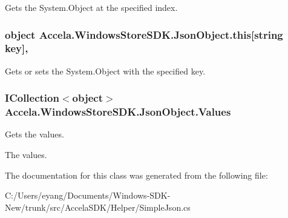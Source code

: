 Gets the System.\+Object at the specified index. 

\hypertarget{class_accela_1_1_windows_store_s_d_k_1_1_json_object_a4f4041ba89a5c5db23a217e899828039}{
\subsubsection[{this[string key]}]{\setlength{\rightskip}{0pt plus 5cm}object Accela.\+Windows\+Store\+S\+D\+K.\+Json\+Object.\+this\mbox{[}string key\mbox{]}\hspace{0.3cm}{\ttfamily [get]}, {\ttfamily [set]}}}\label{class_accela_1_1_windows_store_s_d_k_1_1_json_object_a4f4041ba89a5c5db23a217e899828039}


Gets or sets the System.\+Object with the specified key. 

\hypertarget{class_accela_1_1_windows_store_s_d_k_1_1_json_object_a6781b3ba4f92736d0630aff728f55ba3}{
\subsubsection[{Values}]{\setlength{\rightskip}{0pt plus 5cm}I\+Collection$<$object$>$ Accela.\+Windows\+Store\+S\+D\+K.\+Json\+Object.\+Values\hspace{0.3cm}{\ttfamily [get]}}}\label{class_accela_1_1_windows_store_s_d_k_1_1_json_object_a6781b3ba4f92736d0630aff728f55ba3}


Gets the values. 

The values.

The documentation for this class was generated from the following file\+:\begin{DoxyCompactItemize}
\item 
C\+:/\+Users/eyang/\+Documents/\+Windows-\/\+S\+D\+K-\/\+New/trunk/src/\+Accela\+S\+D\+K/\+Helper/Simple\+Json.\+cs\end{DoxyCompactItemize}

